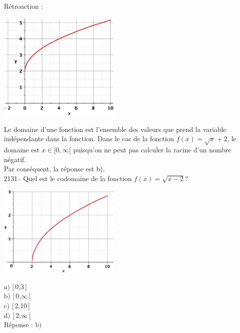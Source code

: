 \documentclass[letterpaper, 12pt]{article}
\begin{document}
R\'etroaction :
\begin{center}
 \includegraphics[width=6cm,bb=20 147 575 644]{Q2130.eps}
\end{center}
Le domaine d'une fonction est l'ensemble des valeurs que prend la variable ind\'ependante dans la fonction. Dans le cas de la fonction $f(x)=\sqrt{x}+2$, le domaine est $x\in[0,\infty$[ puisqu'on ne peut pas calculer la racine d'un nombre n\'egatif.\\
Par cons\'equent, la r\'eponse est b).\\

2131-- Quel est le codomaine de la fonction $f(x)=\sqrt{x-2}$?\\
\begin{center}
 \includegraphics[width=6cm,bb=20 147 575 644]{Q2131.eps}
\end{center}

a$)$ [\,0,3\,]\\
b$)$ [\,0,$\infty$\,[\\
c$)$ [\,2,10\,]\\
d$)$ [\,2,$\infty$\,[\\

R\'eponse : b$)$\\
\end{document}
